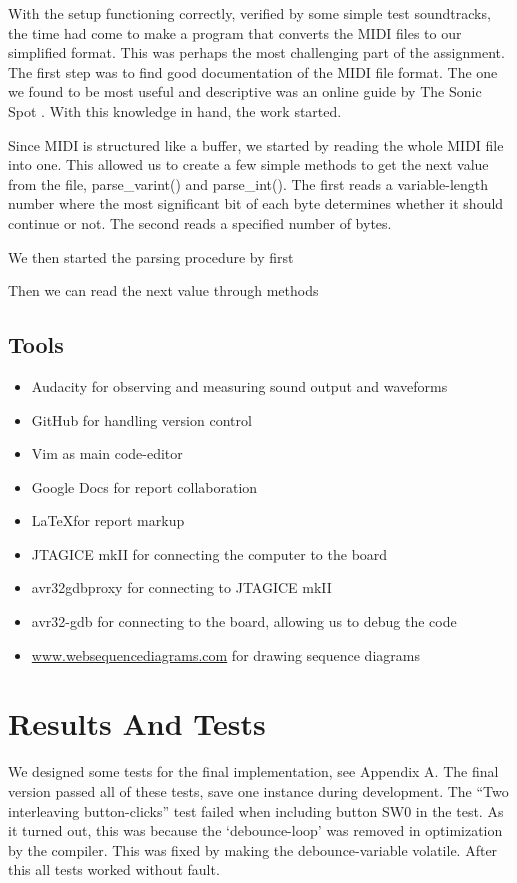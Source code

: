 \documentclass[a4paper,12pt]{article}
\begin{document}
With the setup functioning correctly, verified by some simple test soundtracks, the time had come to make a program that converts the MIDI files to our simplified format. This was perhaps the most challenging part of the assignment. The first step was to find good documentation of the MIDI file format. The one we found to be most useful and descriptive was an online guide by The Sonic Spot \cite{sonicspot}. With this knowledge in hand, the work started.

Since MIDI is structured like a buffer, we started by reading the whole MIDI file into one. This allowed us to create a few simple methods to get the next value from the file, parse\_varint() and parse\_int(). The first reads a variable-length number where the most significant bit of each byte determines whether it should continue or not. The second reads a specified number of bytes.

We then started the parsing procedure by first 

Then we can read the next value through methods


\subsection{Tools}

\begin{itemize}
\item Audacity for observing and measuring sound output and waveforms
\item GitHub for handling version control
\item Vim as main code-editor
\item Google Docs for report collaboration
\item \LaTeX for report markup
\item JTAGICE mkII for connecting the computer to the board
\item avr32gdbproxy for connecting to JTAGICE mkII
\item avr32-gdb for connecting to the board, allowing us to debug the code
\item \url{www.websequencediagrams.com} for drawing sequence diagrams
\end{itemize}

\clearpage
\section{Results And Tests}
We designed some tests for the final implementation, see Appendix A. The final version passed all of these tests, save one instance during development. The  “Two interleaving button-clicks” test failed when including button SW0 in the test. As it turned out, this was because the ‘debounce-loop’ was removed in optimization by the compiler. This was fixed by making the debounce-variable volatile. After this all tests worked without fault.
\end{document}
